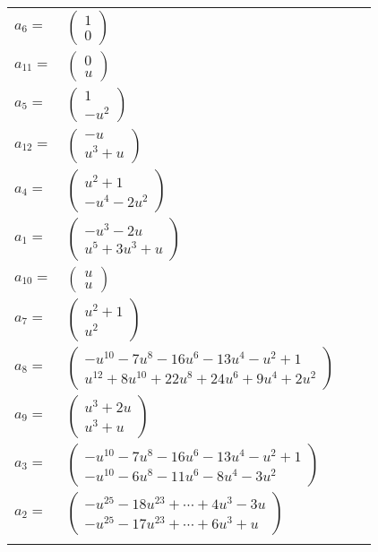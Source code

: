 \documentclass[1p]{elsarticle_modified}
\theoremstyle{definition}
\begin{document}
\begin{tabular}{m{7pt} m{180pt} m{7pt} m{180pt} }
\flushright $a_{6}=$&$\begin{pmatrix}1\\0\end{pmatrix}$ \\
\flushright $a_{11}=$&$\begin{pmatrix}0\\u\end{pmatrix}$ \\
\flushright $a_{5}=$&$\begin{pmatrix}1\\- u^2\end{pmatrix}$ \\
\flushright $a_{12}=$&$\begin{pmatrix}- u\\u^3+u\end{pmatrix}$ \\
\flushright $a_{4}=$&$\begin{pmatrix}u^2+1\\- u^4-2 u^2\end{pmatrix}$ \\
\flushright $a_{1}=$&$\begin{pmatrix}- u^3-2 u\\u^5+3 u^3+u\end{pmatrix}$ \\
\flushright $a_{10}=$&$\begin{pmatrix}u\\u\end{pmatrix}$ \\
\flushright $a_{7}=$&$\begin{pmatrix}u^2+1\\u^2\end{pmatrix}$ \\
\flushright $a_{8}=$&$\begin{pmatrix}- u^{10}-7 u^8-16 u^6-13 u^4- u^2+1\\u^{12}+8 u^{10}+22 u^8+24 u^6+9 u^4+2 u^2\end{pmatrix}$ \\
\flushright $a_{9}=$&$\begin{pmatrix}u^3+2 u\\u^3+u\end{pmatrix}$ \\
\flushright $a_{3}=$&$\begin{pmatrix}- u^{10}-7 u^8-16 u^6-13 u^4- u^2+1\\- u^{10}-6 u^8-11 u^6-8 u^4-3 u^2\end{pmatrix}$ \\
\flushright $a_{2}=$&$\begin{pmatrix}- u^{25}-18 u^{23}+\cdots+4 u^3-3 u\\- u^{25}-17 u^{23}+\cdots+6 u^3+u\end{pmatrix}$\\&\end{tabular}
\end{document}
